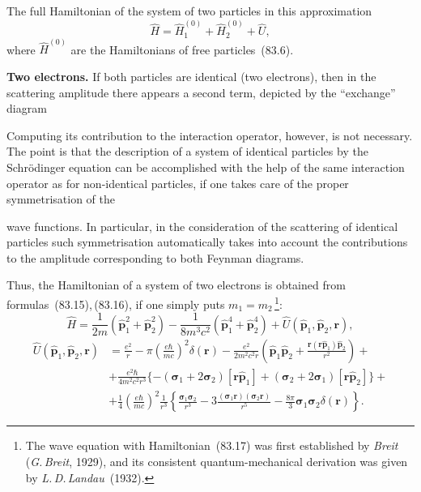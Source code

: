 The full Hamiltonian of the system of two particles in this approximation
\begin{equation}
\hat{H} = \hat{H}_1^{(0)} + \hat{H}_2^{(0)} + \hat{U},
\tag{83.16}
\end{equation}
where $\hat{H}^{(0)}$ are the Hamiltonians of free particles~(83.6).

\textbf{Two electrons.} If both particles are identical (two electrons), then in the scattering amplitude there appears a second term, depicted by the ``exchange'' diagram

Computing its contribution to the interaction operator, however, is not necessary. The point is that the description of a system of identical particles by the Schr\"odinger equation can be accomplished with the help of the same interaction operator as for non-identical particles, if one takes care of the proper symmetrisation of the

wave functions. In particular, in the consideration of the scattering of identical particles such symmetrisation automatically takes into account the contributions to the amplitude corresponding to both Feynman diagrams.

Thus, the Hamiltonian of a system of two electrons is obtained from formulas~(83.15),\,(83.16), if one simply puts $m_1 = m_2$\,\footnote{The wave equation with Hamiltonian~(83.17) was first established by \textit{Breit} (\textit{G.\,Breit}, 1929), and its consistent quantum-mechanical derivation was given by \textit{L.\,D.\,Landau}~(1932).}:
\begin{equation}
\hat{H} = \frac{1}{2m}(\hat{\mathbf{p}}_1^2+\hat{\mathbf{p}}_2^2) - \frac{1}{8m^3c^2}(\hat{\mathbf{p}}_1^4+\hat{\mathbf{p}}_2^4) + \hat{U}(\hat{\mathbf{p}}_1, \hat{\mathbf{p}}_2, \mathbf{r}),
\end{equation}
\begin{equation}
\begin{split}
\hat{U}(\hat{\mathbf{p}}_1, \hat{\mathbf{p}}_2, \mathbf{r}) &= \frac{e^2}{r} - \pi\left(\frac{e\hbar}{mc}\right)^2\delta(\mathbf{r}) - \frac{e^2}{2m^2c^2r}\left(\hat{\mathbf{p}}_1\hat{\mathbf{p}}_2+\frac{\mathbf{r}(\mathbf{r}\hat{\mathbf{p}}_1)\hat{\mathbf{p}}_2}{r^2}\right)+{}\\
&+\frac{e^2\hbar}{4m^2c^2r^3}\{-(\boldsymbol{\sigma}_1+2\boldsymbol{\sigma}_2)[\mathbf{r}\hat{\mathbf{p}}_1]+(\boldsymbol{\sigma}_2+2\boldsymbol{\sigma}_1)[\mathbf{r}\hat{\mathbf{p}}_2]\}+{}\\
&+\frac{1}{4}\left(\frac{e\hbar}{mc}\right)^2\frac{1}{r^3}\left\{\frac{\boldsymbol{\sigma}_1\boldsymbol{\sigma}_2}{r^3}-3\frac{(\boldsymbol{\sigma}_1\mathbf{r})(\boldsymbol{\sigma}_2\mathbf{r})}{r^5}-\frac{8\pi}{3}\boldsymbol{\sigma}_1\boldsymbol{\sigma}_2\delta(\mathbf{r})\right\}.
\end{split}
\tag{83.17}
\end{equation}


